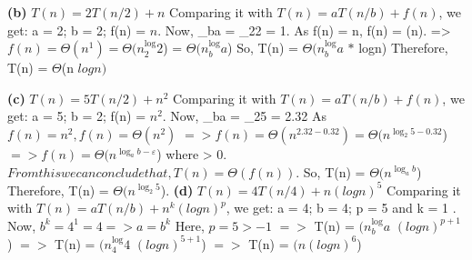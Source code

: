 \documentclass[11pt]{article}
\renewcommand\part[1]{\vspace{.10in}\textbf{(#1)}}
\begin{document}
\newline
\newline 
\part{b} $T(n) = 2T(n/2)+n$
\newline Comparing it with $T(n) = a T(n/b)+ f(n)$, we get:  a = 2; b = 2; f(n) = $n$.
\newline  Now, 
\newline \log_{b}a = \log_{2}2 = 1. 
\newline As f(n) = n, f(n) = \Theta (n).
\newline =>$ f(n) = \Theta (n^1) = \Theta (n^\log_{2}2$) = $\Theta (n^\log_{b}a$)
\newline So, T(n) = $\Theta (n^\log_{b}a$ $*$ logn)
\newline Therefore, T(n) = $\Theta$(n $logn)$

\newline
\newline 
\part{c} $T(n) = 5T(n/2)+n^2$
\newline Comparing it with $T(n) = a T(n/b)+ f(n)$, we get:  a = 5; b = 2; f(n) = $n^2$.
\newline 
\newine Now, \log_{b}a = \log_{2}5 = 2.32
\newline As $f(n) = n^2, f(n) = \Theta (n^2)$
\newine $=> f(n) = \Theta (n^{2.32 - 0.32}) = \Theta (n^{\log_{2}5 - 0.32}$)
\newline $=> f(n) = \Theta (n^{\log_{a}b - \varepsilon}$) where \varepsilon > 0. 
\newline 
\newline $From this we can conclude that, T(n) = \Theta (f(n))$. 
\newline So, T(n) = $\Theta (n^{\log_{a}b}$)
\newline Therefore, T(n) = $\Theta (n^{\log_{2}5}$). 
\newline 
\newline
\part{d} $T(n) = 4T(n/4)+n(logn)^5$
\newline Comparing it with $T(n) = a T(n/b)+ n^k (log n)^p$, we get:  a = 4; b = 4; p = 5 and k = 1 .
\newline Now, $b^k = 4^1 = 4 => a = b^k$
\newline Here, $p = 5 > -1$
\newline $=>$ T(n) = \Theta $(n^\log_{b}a$ $(log n)^{p+1}$)
\newline $=>$ T(n) = \Theta $(n^\log_{4}4$ $(log n)^{5+1}$)
\newline $=>$ T(n) = \Theta $(n(log n)^6$)
\newline
\newline 
\end{document}
